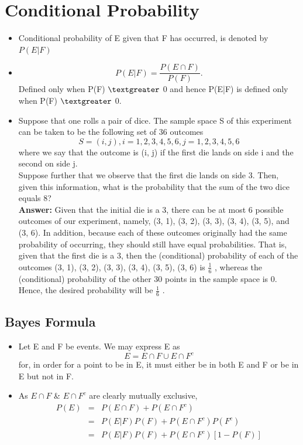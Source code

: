 \documentclass[a4paper,oneside]{book}
\begin{document}
\section{Conditional Probability}
\begin{itemize}
\item Conditional probability of E given that F has occurred, is denoted by $P(E|F)$
\item $$ P(E|F) = \dfrac{P(E \cap F)}{P(F)}.$$ Defined only when P(F) $\textgreater$ 0 and hence P(E|F) is defined
only when P(F) $\textgreater$ 0. 
\item Suppose that one rolls a pair of dice. The
sample space S of this experiment can be taken to be the following set of 36 outcomes
$$ S = {(i, j),
i = 1, 2, 3, 4, 5, 6,
j = 1, 2, 3, 4, 5, 6} $$where we say that the outcome is (i, j) if the first die lands on side i and the second on
side j.\\
Suppose further
that we observe that the first die lands on side 3. Then, given this information, what is the
probability that the sum of the two dice equals 8?\\
\textbf{Answer:} Given that the initial die is a 3, there can be at most 6 possible outcomes of our
experiment, namely, (3, 1), (3, 2), (3, 3), (3, 4), (3, 5), and (3, 6). In addition, because
each of these outcomes originally had the same probability of occurring, they should still
have equal probabilities. That is, given that the first die is a 3, then the (conditional)
probability of each of the outcomes (3, 1), (3, 2), (3, 3), (3, 4), (3, 5), (3, 6) is $\frac{1}{6} $ , whereas the (conditional) probability of the other 30 points in the sample space is 0. Hence, the desired probability will be $\frac{1}{6} $ .
\end{itemize}
\subsection{Bayes Formula}
\begin{itemize}
\item Let E and F be events. We may express E as
$$ E = E \cap F \cup E \cap F^{c} $$
for, in order for a point to be in E, it must either be in both E and F or be in E but not in F.
\item As $E \cap F$ \& $E \cap F^{c}$ are clearly mutually exclusive,
\begin{eqnarray}
P(E) & = & P(E \cap F) + P(E \cap F^{c})\\
& = & P(E | F)P(F ) + P(E \cap F^{c})P(F^{c})\\
& = & P(E | F)P(F ) + P(E \cap F^{c})[1 - P(F)]
\end{eqnarray}
\end{itemize}
\end{document}
